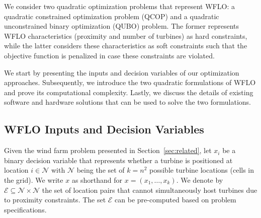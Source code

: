 \documentclass[preprint,12pt]{elsarticle}
\begin{document}
We consider two
quadratic optimization problems that represent WFLO: a
quadratic constrained optimization problem (QCOP) and 
a quadratic unconstrained binary optimization (QUBO) problem. 
The former represents WFLO characteristics (proximity and number of turbines)
as hard constraints, while the latter considers these characteristics as soft constraints such that the objective function is penalized in case these
constraints are violated.

We start by presenting the inputs and decision variables of our optimization approaches.
Subsequently, we introduce the two quadratic formulations of WFLO and 
prove its computational complexity. Lastly, we discuss the details of existing
software and hardware solutions that can be used to solve the two formulations. 

\subsection{WFLO Inputs and Decision Variables}
Given the wind farm problem presented in Section~\ref{sec:related},
let $x_i$ be a binary decision variable that represents whether a 
turbine is positioned at location 
$i \in \mathcal{N}$ with $\mathcal{N}$ being the set 
of $k = n^2$ possible turbine locations (cells in the grid). We 
write $x$ as shorthand for $x = (x_1,\ldots, x_k)$. 
We denote by $\mathcal{E} \subseteq \mathcal{N}\times \mathcal{N}$
the set of location pairs that cannot simultaneously host turbines 
due to proximity constraints. The set $\mathcal{E}$ can be pre-computed 
based on problem specifications.
\end{document}
